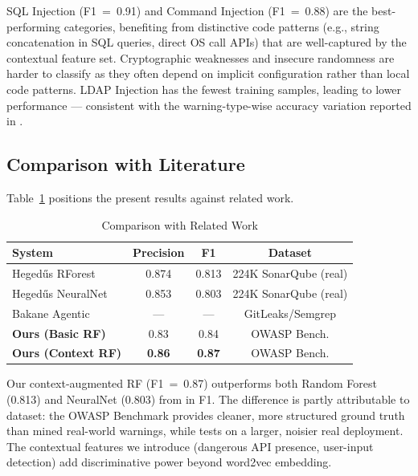 \documentclass[conference]{IEEEtran}
\begin{document}
SQL Injection (F1~=~0.91) and Command Injection (F1~=~0.88) are the best-performing
categories, benefiting from distinctive code patterns (e.g., string concatenation
in SQL queries, direct OS call APIs) that are well-captured by the contextual
feature set. Cryptographic weaknesses and insecure randomness are harder to
classify as they often depend on implicit configuration rather than local code
patterns. LDAP Injection has the fewest training samples, leading to lower
performance --- consistent with the warning-type-wise accuracy variation reported
in \cite{hegedus2022sca}.

\subsection{Comparison with Literature}

Table~\ref{tab:comparison} positions the present results against related work.

\begin{table}[htbp]
  \centering
  \caption{Comparison with Related Work}
  \label{tab:comparison}
  \renewcommand{\arraystretch}{1.2}
  \begin{tabular}{lccc}
    \toprule
    \textbf{System} & \textbf{Precision} & \textbf{F1} & \textbf{Dataset} \\
    \midrule
    Heged\H{u}s RForest \cite{hegedus2022sca} &
      0.874 & 0.813 & 224K SonarQube (real) \\
    Heged\H{u}s NeuralNet \cite{hegedus2022sca} &
      0.853 & 0.803 & 224K SonarQube (real) \\
    Bakane Agentic \cite{bakane2025thesis} &
      --- & --- & GitLeaks/Semgrep \\
    \textbf{Ours (Basic RF)} &
      0.83 & 0.84 & OWASP Bench. \\
    \textbf{Ours (Context RF)} &
      \textbf{0.86} & \textbf{0.87} & OWASP Bench. \\
    \bottomrule
  \end{tabular}
\end{table}

Our context-augmented RF (F1~=~0.87) outperforms both Random Forest (0.813) and
NeuralNet (0.803) from \cite{hegedus2022sca} in F1. The difference is partly
attributable to dataset: the OWASP Benchmark provides cleaner, more structured
ground truth than mined real-world warnings, while \cite{hegedus2022sca} tests on
a larger, noisier real deployment. The contextual features we introduce
(dangerous API presence, user-input detection) add discriminative power beyond
word2vec embedding.
\end{document}
